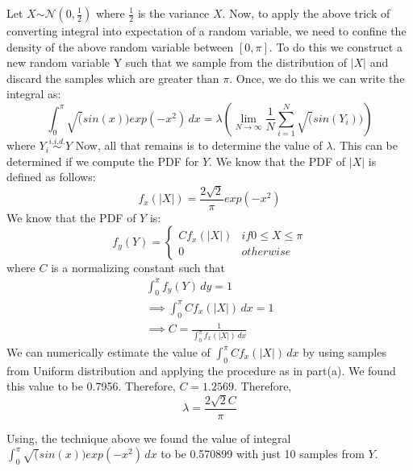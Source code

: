 \documentclass{article}
\begin{document}
\begin{enumerate}
\begin{enumerate}
			\noindent %
			Let $X \stackrel{}{\sim} \mathcal{N} (0, \frac{1}{2})$ where $\frac{1}{2}$ is the variance $X$. Now, to apply the above trick of converting integral into
			expectation of a random variable, we need to confine the density of the above random variable between $[0, \pi]$. To do this we construct a new random 
			variable Y such that we sample from the distribution of $|X|$ and discard the samples which are greater than $\pi$. Once, we do this we can write the
			integral as:
			\begin{equation}
			\nonumber
				\int_{0}^{\pi}\sqrt(sin(x))exp(-x^2) \,dx = \lambda \left ( \lim_{N\to\infty} \frac{1}{N}\sum_{i=1}^{N}\sqrt(sin(Y_{i})) \right )
			\end{equation}
			where $Y_{i} \stackrel{i.i.d.}{\sim} Y$ 
            Now, all that remains is to determine the value of $\lambda$. This can be determined if we compute the PDF for $Y$. We know that the PDF of $|X|$ is 
			defined as follows:
			\begin{equation}
			\nonumber
				f_{x}(|X|) = \frac{2\sqrt{2}}{\pi} exp(-x^2)
			\end{equation}
			We know that the PDF of $Y$ is:
			\begin{equation}
			\nonumber
				f_{y}(Y) = \begin{cases}
				 Cf_{x}(|X|) & if 0 \le X \le \pi \\
				0 & otherwise
				\end{cases}
			\end{equation}
			where $C$ is a normalizing constant such that
			\begin{equation}
			\nonumber
				\begin{gathered}
				\int_{0}^{\pi} f_{y}(Y) \,dy = 1 \\
				\implies \int_{0}^{\pi} Cf_{x}(|X|) \,dx = 1 \\
				\implies C = \frac{1}{\int_{0}^{\pi} f_{x}(|X|) \,dx}
				\end{gathered}
			\end{equation}
			We can numerically estimate the value of $\int_{0}^{\pi} Cf_{x}(|X|) \,dx$ by using samples from Uniform distribution and applying the procedure as in part(a). 
			We found this value to be 0.7956. Therefore, $C = 1.2569$. Therefore, 
			\begin{equation}
			\nonumber
				\lambda = \frac{2\sqrt{2}C}{\pi}
			\end{equation}
			
			Using, the technique above we found the value of integral $\int_{0}^{\pi}\sqrt(sin(x))exp(-x^2) \,dx$ to be 0.570899 with just 10 samples from $Y$.
			

\end{enumerate}
\end{enumerate}
\end{document}
